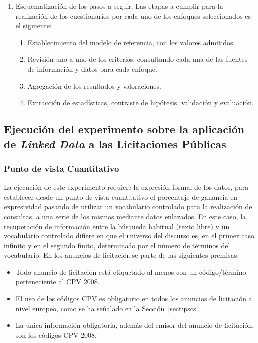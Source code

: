 \begin{enumerate}
 \item Esquematización de los pasos a seguir. Las etapas a cumplir para la realización de los cuestionarios por cada 
uno de los enfoques seleccionados es el siguiente:
\begin{enumerate}
 \item Establecimiento del modelo de referencia, con los valores admitidos.
 \item Revisión uno a uno de los criterios, consultando cada una de las fuentes de información y datos para 
cada enfoque.
 \item Agregación de los resultados y valoraciones.
 \item Extracción de estadísticas, contraste de hipótesis, validación y evaluación.
\end{enumerate}

\end{enumerate}

\subsection{Ejecución del experimento sobre la aplicación de \textit{Linked Data} a las Licitaciones Públicas}

\subsubsection{Punto de vista Cuantitativo}
La ejecución de este experimento requiere la expresión formal de los datos, para establecer desde un punto 
de vista cuantitativo el porcentaje de ganancia en expresividad pasando de utilizar un vocabulario controlado para la realización 
de consultas, a una serie de los mismos mediante datos enlazados. En este caso, la recuperación de información 
entre la búsqueda habitual (texto libre) y un vocabulario controlado difiere en que el universo del discurso es, 
en el primer caso infinito y en el segundo finito, determinado por el número de términos del vocabulario. En los anuncios 
de licitación se parte de las siguientes premisas:
\begin{itemize}
 \item Todo anuncio de licitación está etiquetado al menos con un código/término perteneciente al \gls{CPV} 2008.
 \item El uso de los códigos CPV es obligatorio en todos los anuncios de licitación a nivel europeo, como 
se ha señalado en la Sección~\ref{sect:pscs}.
 \item La única información obligatoria, además del emisor del anuncio de licitación, son los códigos CPV 2008.
\end{itemize}

